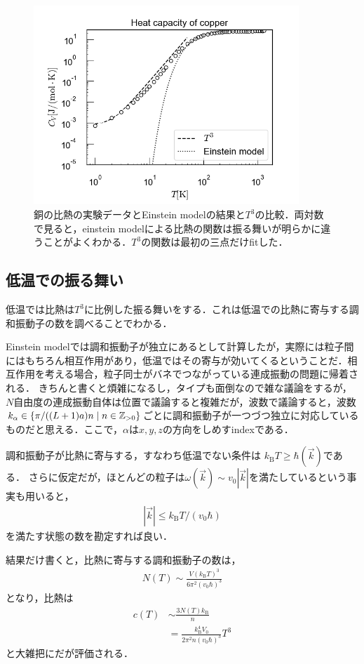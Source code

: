 \documentclass[dvipdfmx, a4paper]{jsarticle}
\theoremstyle{break}
\newcommand{\Z}{\mathbb{Z}}
\numberwithin{equation}{section}
\begin{document}
	\begin{figure}[H]
			\centering
			\includegraphics[width=10cm]{./img/einstein_logcompare.png}
			\caption{銅の比熱の実験データとEinstein modelの結果と$T^3$の比較．両対数で見ると，einstein modelによる比熱の関数は振る舞いが明らかに違うことがよくわかる．$T^3$の関数は最初の三点だけfitした．}
			\label{fig:einstein_log}
	\end{figure}
	\subsection{低温での振る舞い}
	低温では比熱は$T^3$に比例した振る舞いをする．これは低温での比熱に寄与する調和振動子の数を調べることでわかる．

	Einstein modelでは調和振動子が独立にあるとして計算したが，実際には粒子間にはもちろん相互作用があり，低温ではその寄与が効いてくるということだ．相互作用を考える場合，粒子同士がバネでつながっている連成振動の問題に帰着される．
	きちんと書くと煩雑になるし，タイプも面倒なので雑な議論をするが，$N$自由度の連成振動自体は位置で議論すると複雑だが，波数で議論すると，波数$k_{\alpha}\in\qty{\pi/ ((L+1)a)n\mid n\in \Z_{>0}}$ごとに調和振動子が一つづつ独立に対応しているものだと思える．ここで，$\alpha$は$x, y, z$の方向をしめすindexである．

	調和振動子が比熱に寄与する，すなわち低温でない条件は
	$k_{\text{B}}T \geq \hbar(\vec{k})$である．
	さらに仮定だが，ほとんどの粒子は$\omega(\vec{k})\sim v_0|\vec{k}|$を満たしているという事実も用いると，
	\begin{align}
			|\vec{k}| \leq k_{\text{B}} T / (v_0\hbar) \label{eq:T3wavelen}
	\end{align}
	を満たす状態の数を勘定すれば良い．

	結果だけ書くと，比熱に寄与する調和振動子の数は，
	\begin{align}
			N(T) \sim \frac{V(k_{\text{B}}T)^3}{6\pi^2 (v_0\hbar)^3}\label{eq:T3statenum}
	\end{align}
	となり，比熱は
	\begin{align}
			c(T) 
			&\sim \frac{3N(T)k_{\text{B}}}{n}\\
			&= \frac{k_{\text{B}}^4 V_0}{2\pi^2 n (v_0\hbar)^3}T^3
	\end{align}
	と大雑把にだが評価される．
\end{document}
